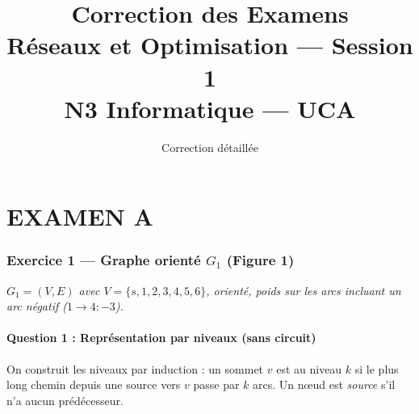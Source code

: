 \documentclass[12pt,a4paper]{article}
\title{
    \textbf{\Huge\color{titrebleu}Correction des Examens}\\[0.5em]
    \textbf{\Large\color{defvert}Réseaux et Optimisation --- Session 1}\\[0.5em]
    \large\color{algoviolet}N3 Informatique --- UCA
}
\author{Correction détaillée}
\date{}
\begin{document}
\maketitle
\tableofcontents
\newpage

\part*{\color{titrebleu}EXAMEN A}

\section{Exercice 1 --- Graphe orienté $G_1$ (Figure 1)}

\textit{$G_1 = (V, E)$ avec $V = \{s,1,2,3,4,5,6\}$, orienté, poids sur les arcs incluant un arc négatif ($1 \to 4 : -3$).}

\subsection{Question 1 : Représentation par niveaux (sans circuit)}

\begin{methode}
On construit les niveaux par induction : un sommet $v$ est au niveau $k$ si le plus long chemin depuis une source vers $v$ passe par $k$ arcs. Un nœud est \emph{source} s'il n'a aucun prédécesseur.
\end{methode}
\end{document}
